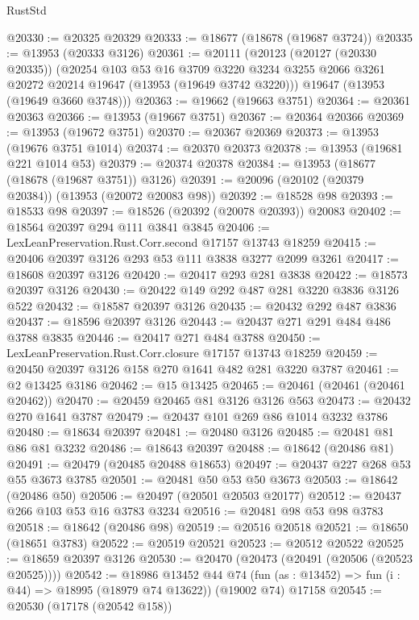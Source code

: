 \begin{lexlean}{RustStd}
\begin{coremodule}
@20330 := @20325 @20329
@20333 := @18677 (@18678 (@19687 @3724))
@20335 := @13953 (@20333 @3126)
@20361 := @20111
    (@20123
      (@20127 (@20330 @20335))
      (@20254
        @103
        @53
        @16
        @3709
        @3220
        @3234
        @3255
        @2066
        @3261
        @20272
        @20214
        @19647
        (@13953 (@19649 @3742 @3220)))
      @19647
      (@13953 (@19649 @3660 @3748)))
@20363 := @19662 (@19663 @3751)
@20364 := @20361 @20363
@20366 := @13953 (@19667 @3751)
@20367 := @20364 @20366
@20369 := @13953 (@19672 @3751)
@20370 := @20367 @20369
@20373 := @13953 (@19676 @3751 @1014)
@20374 := @20370 @20373
@20378 := @13953 (@19681 @221 @1014 @53)
@20379 := @20374 @20378
@20384 := @13953 (@18677 (@18678 (@19687 @3751)) @3126)
@20391 := @20096 (@20102 (@20379 @20384)) (@13953 (@20072 @20083 @98))
@20392 := @18528 @98
@20393 := @18533 @98
@20397 := @18526 (@20392 (@20078 @20393)) @20083
@20402 := @18564 @20397 @294 @111 @3841 @3845
@20406 := LexLeanPreservation.Rust.Corr.second @17157 @13743 @18259
@20415 := @20406 @20397 @3126 @293 @53 @111 @3838 @3277 @2099 @3261
@20417 := @18608 @20397 @3126
@20420 := @20417 @293 @281 @3838
@20422 := @18573 @20397 @3126
@20430 := @20422 @149 @292 @487 @281 @3220 @3836 @3126 @522
@20432 := @18587 @20397 @3126
@20435 := @20432 @292 @487 @3836
@20437 := @18596 @20397 @3126
@20443 := @20437 @271 @291 @484 @486 @3788 @3835
@20446 := @20417 @271 @484 @3788
@20450 := LexLeanPreservation.Rust.Corr.closure @17157 @13743 @18259
@20459 := @20450 @20397 @3126 @158 @270 @1641 @482 @281 @3220 @3787
@20461 := @2 @13425 @3186
@20462 := @15 @13425
@20465 := @20461 (@20461 (@20461 @20462))
@20470 := @20459 @20465 @81 @3126 @3126 @563
@20473 := @20432 @270 @1641 @3787
@20479 := @20437 @101 @269 @86 @1014 @3232 @3786
@20480 := @18634 @20397
@20481 := @20480 @3126
@20485 := @20481 @81 @86 @81 @3232
@20486 := @18643 @20397
@20488 := @18642 (@20486 @81)
@20491 := @20479 (@20485 @20488 @18653)
@20497 := @20437 @227 @268 @53 @55 @3673 @3785
@20501 := @20481 @50 @53 @50 @3673
@20503 := @18642 (@20486 @50)
@20506 := @20497 (@20501 @20503 @20177)
@20512 := @20437 @266 @103 @53 @16 @3783 @3234
@20516 := @20481 @98 @53 @98 @3783
@20518 := @18642 (@20486 @98)
@20519 := @20516 @20518
@20521 := @18650 (@18651 @3783)
@20522 := @20519 @20521
@20523 := @20512 @20522
@20525 := @18659 @20397 @3126
@20530 := @20470 (@20473 (@20491 (@20506 (@20523 @20525))))
@20542 := @18986
    @13452
    @44
    @74
    (fun (as : @13452) => fun (i : @44) => @18995 (@18979 @74 @13622))
    (@19002 @74)
    @17158
@20545 := @20530 (@17178 (@20542 @158))

\end{coremodule}
\end{lexlean}
